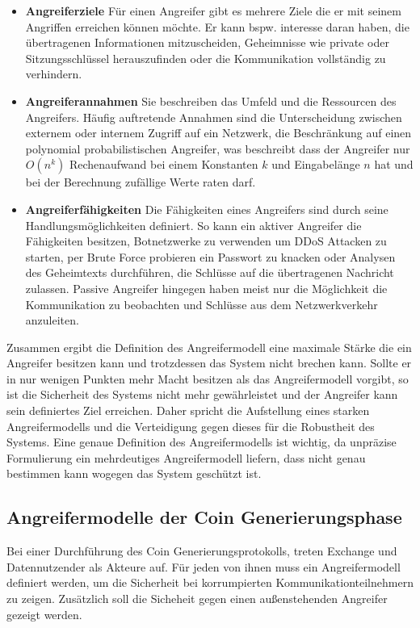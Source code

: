 \documentclass[11pt,a4paper]{scrreprt}
\begin{document}
\begin{itemize}
    \item \textbf{Angreiferziele} Für einen Angreifer gibt es mehrere Ziele die er mit seinem Angriffen erreichen können möchte. Er kann bspw. interesse daran haben, die übertragenen Informationen mitzuscheiden, Geheimnisse wie private oder Sitzungsschlüssel herauszufinden oder die Kommunikation vollständig zu verhindern. 
    \item \textbf{Angreiferannahmen} Sie beschreiben das Umfeld und die Ressourcen des Angreifers. Häufig auftretende Annahmen sind die Unterscheidung zwischen externem oder internem Zugriff auf ein Netzwerk, die Beschränkung auf einen polynomial probabilistischen Angreifer, was beschreibt dass der Angreifer nur $O(n^k)$ Rechenaufwand bei einem Konstanten $k$ und Eingabelänge $n$ hat und bei der Berechnung zufällige Werte raten darf.
    \item \textbf{Angreiferfähigkeiten} Die Fähigkeiten eines Angreifers sind durch seine Handlungsmöglichkeiten definiert. So kann ein aktiver Angreifer die Fähigkeiten besitzen, Botnetzwerke zu verwenden um DDoS Attacken zu starten, per Brute Force probieren ein Passwort zu knacken oder Analysen des Geheimtexts durchführen, die Schlüsse auf die übertragenen Nachricht zulassen. Passive Angreifer hingegen haben meist nur die Möglichkeit die Kommunikation zu beobachten und Schlüsse aus dem Netzwerkverkehr anzuleiten.
\end{itemize} 
Zusammen ergibt die Definition des Angreifermodell eine maximale Stärke die ein Angreifer besitzen kann und trotzdessen das System nicht brechen kann. Sollte er in nur wenigen Punkten mehr Macht besitzen als das Angreifermodell vorgibt, so ist die Sicherheit des Systems nicht mehr gewährleistet und der Angreifer kann sein definiertes Ziel erreichen. Daher spricht die Aufstellung eines starken Angreifermodells und die Verteidigung gegen dieses für die Robustheit des Systems. Eine genaue Definition des Angreifermodells ist wichtig, da unpräzise Formulierung ein mehrdeutiges Angreifermodell liefern, dass nicht genau bestimmen kann wogegen das System geschützt ist.

\subsection{Angreifermodelle der Coin Generierungsphase}
Bei einer Durchführung des Coin Generierungsprotokolls, treten Exchange und Datennutzender als Akteure auf. Für jeden von ihnen muss ein Angreifermodell definiert werden, um die Sicherheit bei korrumpierten Kommunikationteilnehmern zu zeigen. Zusätzlich soll die Sicheheit gegen einen außenstehenden Angreifer gezeigt werden.
\end{document}
